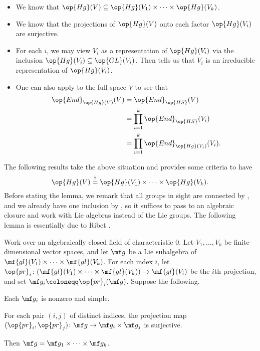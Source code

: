 \documentclass[../thesis.tex]{subfiles}
\begin{document}
\begin{itemize}
	\item We know that $\op{Hg}(V)\subseteq\op{Hg}(V_1)\times\cdots\times\op{Hg}(V_k)$.
	\item We know that the projections of $\op{Hg}(V)$ onto each factor $\op{Hg}(V_i)$ are surjective.
	\item For each $i$, we may view $V_i$ as a representation of $\op{Hg}(V_i)$ via the inclusion $\op{Hg}(V_i)\subseteq\op{GL}(V_i)$. Then  tells us that $V_i$ is an irreducible representation of $\op{Hg}(V_i)$.
	\item One can also apply  to the full space $V$ to see that
	\begin{align*}
		\op{End}_{\op{Hg}(V)}(V) &= \op{End}_{\op{HS}}(V) \\
		&= \prod_{i=1}^k\op{End}_{\op{HS}}(V_i) \\
		&= \prod_{i=1}^k\op{End}_{\op{Hg}(V_i)}(V_i).
	\end{align*}
\end{itemize}
The following results take the above situation and provides some criteria to have
\[\op{Hg}(V)\stackrel?=\op{Hg}(V_1)\times\cdots\times\op{Hg}(V_k).\]
Before stating the lemma, we remark that all groups in sight are connected by , and we already have one inclusion by , so it suffices to pass to an algebraic closure and work with Lie algebras instead of the Lie groups. The following lemma is essentially due to Ribet \cite[pp.~790--791]{ribet-galois-action-rm}.
\begin{lemma}[Ribet] \label{lem:ribet-product}
	Work over an algebraically closed field of characteristic $0$. Let $V_1,\ldots,V_k$ be finite-dimensional vector spaces, and let $\mf g$ be a Lie subalgebra of $\mf{gl}(V_1)\times\cdots\times\mf{gl}(V_k)$. For each index $i$, let $\op{pr}_i\colon(\mf{gl}(V_1)\times\cdots\times\mf{gl}(V_k))\to\mf{gl}(V_i)$ be the $i$th projection, and set $\mf g_i\coloneqq\op{pr}_i(\mf g)$. Suppose the following.
	\begin{listroman}
		\item Each $\mf g_i$ is nonzero and simple.
		\item For each pair $(i,j)$ of distinct indices, the projection map $({\op{pr}_i},{\op{pr}_j})\colon\mf g\to\mf g_i\times\mf g_j$ is surjective.
	\end{listroman}
	Then $\mf g=\mf g_1\times\cdots\times\mf g_k$.
\end{lemma}
\end{document}
